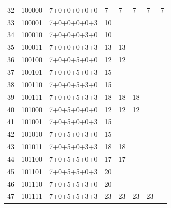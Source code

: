\documentclass[12pt]{extarticle}
\begin{document}
\begin{center}
\begin{tabular}{ | m{1.5cm} | m{1.7cm} | m{3cm} | m{1.2cm} | m{1.3cm} | m{1.3cm} | m{1.5cm} | m{1.5cm} |}
 32 & 100000 & 7+0+0+0+0+0 & 7 &                      7 & 7                 & 7                  & 7\\
 \cline{1-4}
 33 & 100001 & 7+0+0+0+0+3 & 10 & \multirow{2}{*}{ }    & \multirow{6}{*}{ } & \multirow{14}{*}{} & \multirow{30}{*}{}\\
 \cline{1-4}
 34 & 100010 & 7+0+0+0+3+0 & 10 &                       &                    &                    &\\
 \cline{1-4}
 35 & 100011 & 7+0+0+0+3+3 & 13 &                    13 &                    &                    &\\
 \cline{1-5}
 36 & 100100 & 7+0+0+5+0+0 & 12 &                    12 &                    &                    &\\
 \cline{1-4}
 37 & 100101 & 7+0+0+5+0+3 & 15 & \multirow{2}{*}{ }    &                    &                    &\\
 \cline{1-4}
 38 & 100110 & 7+0+0+5+3+0 & 15 &                       &                    &                    &\\
 \cline{1-4}
 39 & 100111 & 7+0+0+5+3+3 & 18 &                    18 & 18                 &                    &\\
 \cline{1-6}

 40 & 101000 & 7+0+5+0+0+0 & 12 &                    12 & 12                 &                    &\\
 \cline{1-4}
 41 & 101001 & 7+0+5+0+0+3 & 15 & \multirow{2}{*}{ }    &                    &                    &\\
 \cline{1-4}
 42 & 101010 & 7+0+5+0+3+0 & 15 &                       &                    &                    &\\
 \cline{1-4}
 43 & 101011 & 7+0+5+0+3+3 & 18 &                    18 &                    &                    &\\
 \cline{1-5}
 44 & 101100 & 7+0+5+5+0+0 & 17 &                    17 &                    &                    &\\
 \cline{1-4}
 45 & 101101 & 7+0+5+5+0+3 & 20 & \multirow{2}{*}{ }    &                    &                    &\\
 \cline{1-4}
 46 & 101110 & 7+0+5+5+3+0 & 20 &                       &                    &                    &\\
 \cline{1-4}
 47 & 101111 & 7+0+5+5+3+3 & 23 &                    23 & 23                 & 23                 &\\
 \cline{1-7}

 \end{tabular}
 \end{center}
\end{document}

